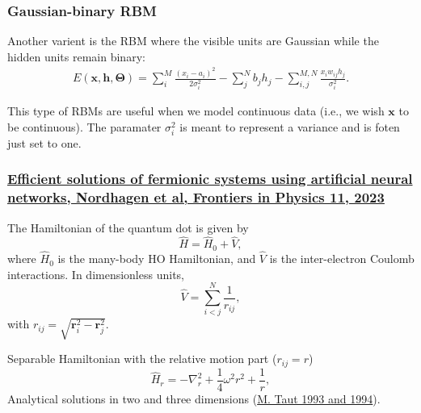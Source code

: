\documentclass[11pt]{beamer} %
\begin{document}
\begin{frame}
\frametitle{Gaussian-binary RBM}

Another varient is the RBM where the visible units are Gaussian while the hidden units remain binary:
\begin{align*}
	E(\mathbf{x}, \mathbf{h},\mathbf{\Theta}) = \sum_i^M \frac{(x_i - a_i)^2}{2\sigma_i^2} - \sum_j^N b_j h_j - \sum_{i,j}^{M,N} \frac{x_i w_{ij} h_j}{\sigma_i^2}. 
\end{align*}

This type of RBMs are useful when we model continuous data (i.e., we wish $\mathbf{x}$ to be continuous). The paramater $\sigma_i^2$ is meant to represent a variance and is foten just set to one.
\end{frame}

\begin{frame}
\frametitle{\href{{https://doi.org/10.3389/fphy.2023.1061580}}{Efficient solutions of fermionic systems using artificial neural networks, Nordhagen et al, Frontiers in Physics 11, 2023}}

The Hamiltonian of the quantum dot is given by
\[ \hat{H} = \hat{H}_0 + \hat{V}, 
\]
where $\hat{H}_0$ is the many-body HO Hamiltonian, and $\hat{V}$ is the
inter-electron Coulomb interactions. In dimensionless units,
\[ \hat{V}= \sum_{i < j}^N \frac{1}{r_{ij}},
\]
with $r_{ij}=\sqrt{\mathbf{r}_i^2 - \mathbf{r}_j^2}$.

Separable Hamiltonian with the relative motion part ($r_{ij}=r$)
\[ 
\hat{H}_r=-\nabla^2_r + \frac{1}{4}\omega^2r^2+ \frac{1}{r},
\]
Analytical solutions in two and three dimensions (\href{{https://journals.aps.org/pra/abstract/10.1103/PhysRevA.48.3561}}{M. Taut 1993 and 1994}).
\end{frame}
\end{document}
